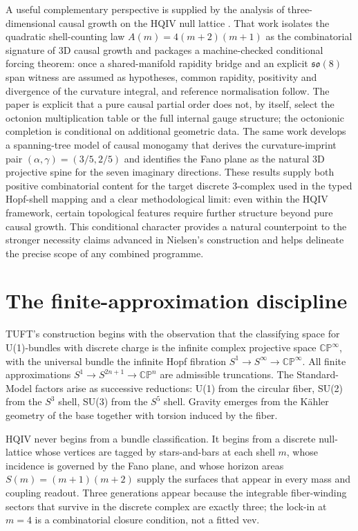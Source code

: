 \documentclass[11pt]{article}
\begin{document}
A useful complementary perspective is supplied by the analysis of three-dimensional causal growth on the HQIV null lattice \cite{hqiv-3d-growth-paper}. That work isolates the quadratic shell-counting law \(A(m)=4(m+2)(m+1)\) as the combinatorial signature of \(3\)D causal growth and packages a machine-checked conditional forcing theorem: once a shared-manifold rapidity bridge and an explicit \(\mathfrak{so}(8)\) span witness are assumed as hypotheses, common rapidity, positivity and divergence of the curvature integral, and reference normalisation follow. The paper is explicit that a pure causal partial order does not, by itself, select the octonion multiplication table or the full internal gauge structure; the octonionic completion is conditional on additional geometric data. The same work develops a spanning-tree model of causal monogamy that derives the curvature-imprint pair \((\alpha,\gamma)=(3/5,2/5)\) and identifies the Fano plane as the natural \(3\)D projective spine for the seven imaginary directions. These results supply both positive combinatorial content for the target discrete \(3\)-complex used in the typed Hopf-shell mapping and a clear methodological limit: even within the HQIV framework, certain topological features require further structure beyond pure causal growth. This conditional character provides a natural counterpoint to the stronger necessity claims advanced in Nielsen's construction and helps delineate the precise scope of any combined programme.

\section{The finite-approximation discipline}

TUFT's construction begins with the observation that the classifying
space for U(1)-bundles with discrete charge is the infinite complex
projective space $\mathbb{CP}^\infty$, with the universal bundle the
infinite Hopf fibration $S^1\to S^\infty\to\mathbb{CP}^\infty$. All
finite approximations $S^1\to S^{2n+1}\to\mathbb{CP}^n$ are admissible
truncations. The Standard-Model factors arise as successive reductions:
U(1) from the circular fiber, SU(2) from the $S^3$ shell, SU(3) from the
$S^5$ shell. Gravity emerges from the Kähler geometry of the base
together with torsion induced by the fiber.

HQIV never begins from a bundle classification. It begins from a discrete
null-lattice whose vertices are tagged by stars-and-bars at each shell
$m$, whose incidence is governed by the Fano plane, and whose horizon
areas $S(m)=(m+1)(m+2)$ supply the surfaces that appear in every mass
and coupling readout. Three generations appear because the integrable
fiber-winding sectors that survive in the discrete complex are exactly
three; the lock-in at $m=4$ is a combinatorial closure condition, not a
fitted vev.
\end{document}
